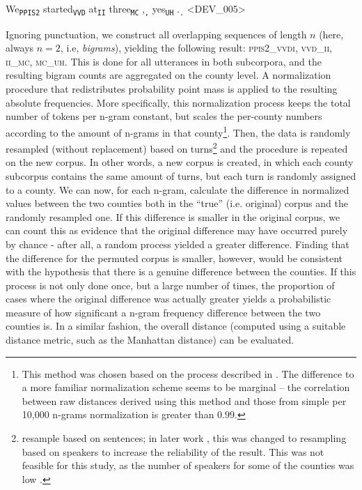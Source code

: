 \documentclass[output=paper]{LSP/langsci}
\begin{document}
\begin{exe}
\ex We\textsubscript{\texttt{PPIS2}} started\textsubscript{\texttt{VVD}} at\textsubscript{\texttt{II}} three\textsubscript{\texttt{MC}} ,\textsubscript{\texttt{,}} yes\textsubscript{\texttt{UH}} .\textsubscript{\texttt{.}}  <DEV\_005>
\end{exe}

Ignoring punctuation, we construct all overlapping sequences of length $n$ (here, always $n=2$, i.e, \emph{bigrams}), yielding the following result: \textsc{ppis2\_vvdi}, \textsc{vvd\_ii}, \textsc{ii\_mc}, \textsc{mc\_uh}. 
This is done for all utterances in both subcorpora, and the resulting bigram counts are aggregated on the county level.
A normalization procedure that redistributes probability point mass is applied to the resulting absolute frequencies.
More specifically, this normalization process keeps the total number of tokens per n-gram constant, but scales the per-county numbers according to the amount of n-grams in that county\footnote{This method was chosen based on the process described in \citet{nerbonne_measure_2006}.
The difference to a more familiar normalization scheme seems to be marginal -- the correlation between raw distances derived using this method and those from simple per 10,000 n-grams normalization is greater than $0.99$.}.
Then, the data is randomly resampled (without replacement) based on turns\footnote{\citet{nerbonne_measure_2006} resample based on sentences; in later work \citep{wiersma_automatically_2011}, this was changed to resampling based on speakers to increase the reliability of the result.
This was not feasible for this study, as the number of speakers for some of the counties was low \citep[see also][]{sanders_statistical_2010}.}
and the procedure is repeated on the new corpus.
In other words, a new corpus is created, in which each county subcorpus contains the same amount of turns, but each turn is randomly assigned to a county.
We can now, for each n-gram, calculate the difference in normalized values between the two counties both in the ``true'' (i.e. original) corpus and the randomly resampled one.
If this difference is smaller in the original corpus, we can count this as evidence that the original difference may have occurred purely by chance - after all, a random process yielded a greater difference.
Finding that the difference for the permuted corpus is smaller, however, would be consistent with the hypothesis that there is a genuine difference between the counties.
If this process is not only done once, but a large number of times, the proportion of cases where the original difference was actually greater yields a probabilistic measure of how significant a n-gram frequency difference between the two counties is.
In a similar fashion, the overall distance (computed using a suitable distance metric, such as the Manhattan distance) can be evaluated.
\end{document}
